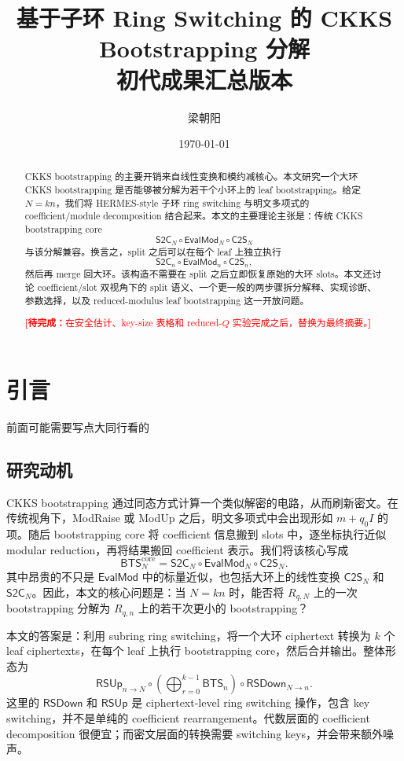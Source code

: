 \documentclass[UTF8,11pt]{article}
\title{基于子环 Ring Switching 的 CKKS Bootstrapping 分解\\
\large 初代成果汇总版本}
\author{梁朝阳}
\date{\today}
\newcommand{\todo}[1]{\textcolor{red}{\textbf{[待完成：}#1\textbf{]}}}
\newcommand{\RSDown}{\mathsf{RSDown}}
\newcommand{\RSUp}{\mathsf{RSUp}}
\newcommand{\CtwoS}{\mathsf{C2S}}
\newcommand{\StwoC}{\mathsf{S2C}}
\newcommand{\EvalMod}{\mathsf{EvalMod}}
\newcommand{\BTS}{\mathsf{BTS}}
\theoremstyle{definition}
\theoremstyle{plain}
\begin{document}
\maketitle

\begin{abstract}
CKKS bootstrapping 的主要开销来自线性变换和模约减核心。本文研究一个大环 CKKS bootstrapping 是否能够被分解为若干个小环上的 leaf bootstrapping。给定 $N=kn$，我们将 HERMES-style 子环 ring switching 与明文多项式的 coefficient/module decomposition 结合起来。本文的主要理论主张是：传统 CKKS bootstrapping core
\[
\StwoC_N\circ\EvalMod_N\circ\CtwoS_N
\]
与该分解兼容。换言之，split 之后可以在每个 leaf 上独立执行
\[
\StwoC_n\circ\EvalMod_n\circ\CtwoS_n,
\]
然后再 merge 回大环。该构造不需要在 split 之后立即恢复原始的大环 slots。本文还讨论 coefficient/slot 双视角下的 split 语义、一个更一般的两步骤拆分解释、实现诊断、参数选择，以及 reduced-modulus leaf bootstrapping 这一开放问题。

\todo{在安全估计、key-size 表格和 reduced-$Q$ 实验完成之后，替换为最终摘要。}
\end{abstract}


\tableofcontents

\newpage

\section{引言}

前面可能需要写点大同行看的


\subsection{研究动机}
CKKS bootstrapping 通过同态方式计算一个类似解密的电路，从而刷新密文。在传统视角下，ModRaise 或 ModUp 之后，明文多项式中会出现形如 $m+q_0 I$ 的项。随后 bootstrapping core 将 coefficient 信息搬到 slots 中，逐坐标执行近似 modular reduction，再将结果搬回 coefficient 表示。我们将该核心写成
\[
\BTS_N^{\mathrm{core}}=\StwoC_N\circ\EvalMod_N\circ\CtwoS_N.
\]
其中昂贵的不只是 $\EvalMod$ 中的标量近似，也包括大环上的线性变换 $\CtwoS_N$ 和 $\StwoC_N$。因此，本文的核心问题是：当 $N=kn$ 时，能否将 $R_{q,N}$ 上的一次 bootstrapping 分解为 $R_{q,n}$ 上的若干次更小的 bootstrapping？

本文的答案是：利用 subring ring switching，将一个大环 ciphertext 转换为 $k$ 个 leaf ciphertexts，在每个 leaf 上执行 bootstrapping core，然后合并输出。整体形态为
\[
\RSUp_{n\to N}\circ\left(\bigoplus_{r=0}^{k-1}\BTS_n\right)\circ\RSDown_{N\to n}.
\]
这里的 $\RSDown$ 和 $\RSUp$ 是 ciphertext-level ring switching 操作，包含 key switching，并不是单纯的 coefficient rearrangement。代数层面的 coefficient decomposition 很便宜；而密文层面的转换需要 switching keys，并会带来额外噪声。
\end{document}
